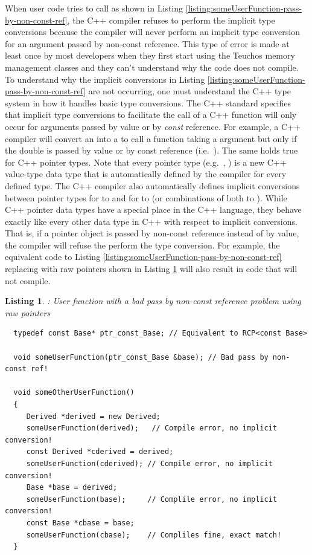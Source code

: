 \documentclass[pdf,ps2pdf,11pt]{SANDreport}
\newtheorem{listing}{Listing}
\begin{document}
When user code tries to call {} as shown in
Listing {}\ref{listing:someUserFunction-pass-by-non-const-ref}, the
C++ compiler refuses to perform the implicit type conversions because
the compiler will never perform an implicit type conversion for an
argument passed by non-const reference.  This type of error is made at
least once by most developers when they first start using the Teuchos
memory management classes and they can't understand why the code does
not compile.  To understand why the implicit conversions in Listing
{}\ref{listing:someUserFunction-pass-by-non-const-ref} are not
occurring, one must understand the C++ type system in how it handles
basic type conversions.  The C++ standard specifies that implicit type
conversions to facilitate the call of a C++ function will only occur
for arguments passed by value or by {}\textit{const} reference.  For
example, a C++ compiler will convert an {} into a
{} to call a function taking a {} argument but
only if the double is passed by value or by const reference (i.e.\
{}).  The same holds true for C++ pointer types.
Note that every pointer type (e.g.\ {}\ttt{int*}, {}\ttt{SomeType*})
is a new C++ value-type data type that is automatically defined by the
compiler for every defined type.  The C++ compiler also automatically
defines implicit conversions between pointer types for {}\ttt{T*} to
{}\ttt{const T*} and for {}\ttt{Base*} to {} (or
combinations of both {}\ttt{Derived*} to {}).
While C++ pointer data types have a special place in the C++ language,
they behave exactly like every other data type in C++ with respect to
implicit conversions.  That is, if a pointer object is passed by
non-const reference instead of by value, the compiler will refuse the
perform the type conversion.  For example, the equivalent code to
Listing {}\ref{listing:someUserFunction-pass-by-non-const-ref}
replacing {} with raw pointers shown in Listing
{}\ref{listing:someUserFunction-pass-by-non-const-ref-raw-ptr} will
also result in code that will not compile.


{}\begin{listing}: User function with a bad pass by non-const
reference problem using raw pointers
\label{listing:someUserFunction-pass-by-non-const-ref-raw-ptr}
{\small\begin{verbatim}
  typedef const Base* ptr_const_Base; // Equivalent to RCP<const Base>

  void someUserFunction(ptr_const_Base &base); // Bad pass by non-const ref!

  void someOtherUserFunction()
  {
     Derived *derived = new Derived;
     someUserFunction(derived);   // Compile error, no implicit conversion!
     const Derived *cderived = derived;
     someUserFunction(cderived); // Compile error, no implicit conversion!
     Base *base = derived;
     someUserFunction(base);     // Complile error, no implicit conversion!
     const Base *cbase = base;
     someUserFunction(cbase);    // Compliles fine, exact match!
  }
\end{verbatim}}
\end{listing}
\end{document}
